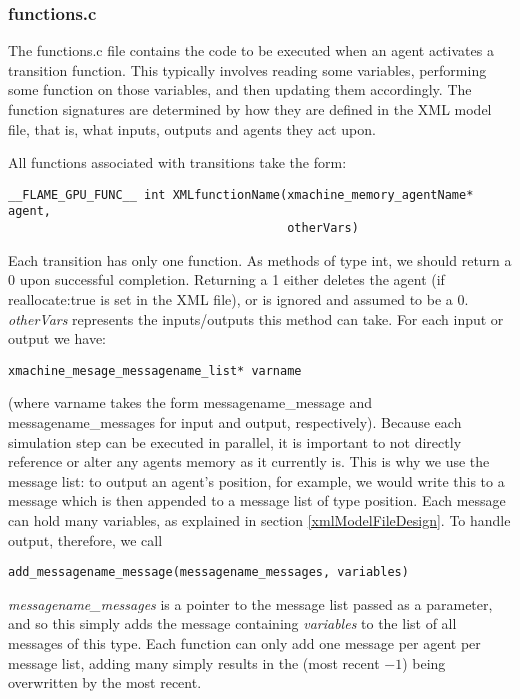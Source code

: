 \documentclass[11pt,a4paper]{article}
\begin{document}
\subsubsection{functions.c}

The functions.c file contains the code to be executed when an agent activates a transition function. This typically involves reading some variables, performing some function on those variables, and then updating them accordingly. The function signatures are determined by how they are defined in the XML model file, that is, what inputs, outputs and agents they act upon.

All functions associated with transitions take the form: 
\begin{lstlisting}
__FLAME_GPU_FUNC__ int XMLfunctionName(xmachine_memory_agentName* agent, 
                                       otherVars) 
\end{lstlisting} Each transition has only one function. As methods of type int, we should return a 0 upon successful completion. Returning a 1 either deletes the agent (if reallocate:true is set in the XML file), or is ignored and assumed to be a 0. \emph{otherVars} represents the inputs/outputs this method can take. For each input or output we have: 

\begin{lstlisting}
xmachine_mesage_messagename_list* varname
\end{lstlisting}
\noindent (where varname takes the form messagename\_message and messagename\_messages for input and output, respectively). Because each simulation step can be executed in parallel, it is important to not directly reference or alter any agents memory as it currently is. This is why we use the message list: to output an agent's position, for example, we would write this to a message which is then appended to a message list of type position. Each message can hold many variables, as explained in section \ref{xmlModelFileDesign}. To handle output, therefore, we call 
\begin{lstlisting}
add_messagename_message(messagename_messages, variables)
\end{lstlisting}

\noindent \emph{messagename\_messages} is a pointer to the message list passed as a parameter, and so this simply adds the message containing \emph{variables} to the list of all messages of this type. Each function can only add one message per agent per message list, adding many simply results in the (most recent $-1$) being overwritten by the most recent.
\end{document}
